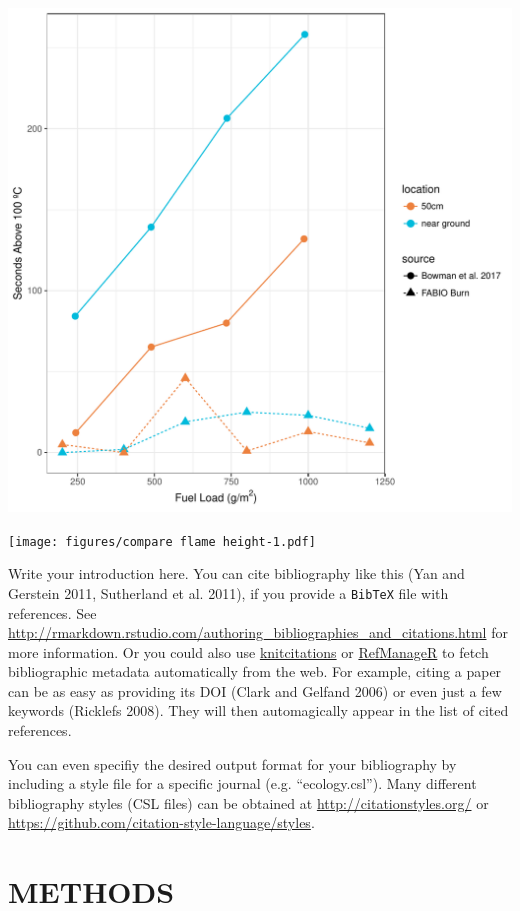 \documentclass[11pt,a4paper]{article}
\begin{document}
\includegraphics{figures/compare_sAbv100-1.pdf}

\texttt{[image: figures/compare flame height-1.pdf]}

Write your introduction here. You can cite bibliography like this (Yan
and Gerstein 2011, Sutherland et al. 2011), if you provide a
\texttt{BibTeX} file with references. See
\url{http://rmarkdown.rstudio.com/authoring_bibliographies_and_citations.html}
for more information. Or you could also use
\href{https://cran.r-project.org/web/packages/knitcitations/index.html}{knitcitations}
or
\href{https://cran.r-project.org/web/packages/RefManageR/index.html}{RefManageR}
to fetch bibliographic metadata automatically from the web. For example,
citing a paper can be as easy as providing its DOI (Clark and Gelfand
2006) or even just a few keywords (Ricklefs 2008). They will then
automagically appear in the list of cited references.

You can even specifiy the desired output format for your bibliography by
including a style file for a specific journal (e.g. ``ecology.csl'').
Many different bibliography styles (CSL files) can be obtained at
\url{http://citationstyles.org/} or
\url{https://github.com/citation-style-language/styles}.

\section{METHODS}\label{methods}
\end{document}
